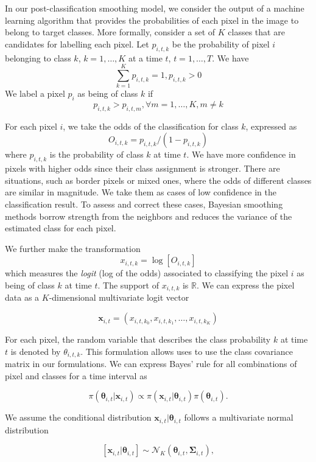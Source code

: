 \documentclass[
  11pt,
]{report}
\begin{document}
In our post-classification smoothing model, we consider the output of a
machine learning algorithm that provides the probabilities of each pixel
in the image to belong to target classes. More formally, consider a set
of \(K\) classes that are candidates for labelling each pixel. Let
\(p_{i,t,k}\) be the probability of pixel \(i\) belonging to class
\(k\), \(k = 1, \dots, K\) at a time \(t\), \(t=1,\dots{},T\). We have
\[
\sum_{k=1}^K p_{i,t,k} = 1, p_{i,t,k} > 0
\] We label a pixel \(p_i\) as being of class \(k\) if \[
    p_{i,t,k} > p_{i,t,m}, \forall m = 1, \dots, K, m \neq k
\]

For each pixel \(i\), we take the odds of the classification for class
\(k\), expressed as \[
    O_{i,t,k} = p_{i,t,k} / (1-p_{i,t,k})
\] where \(p_{i,t,k}\) is the probability of class \(k\) at time \(t\).
We have more confidence in pixels with higher odds since their class
assignment is stronger. There are situations, such as border pixels or
mixed ones, where the odds of different classes are similar in
magnitude. We take them as cases of low confidence in the classification
result. To assess and correct these cases, Bayesian smoothing methods
borrow strength from the neighbors and reduces the variance of the
estimated class for each pixel.

We further make the transformation \[
    x_{i,t,k} = \log [O_{i,t,k}]
\] which measures the \emph{logit} (log of the odds) associated to
classifying the pixel \(i\) as being of class \(k\) at time \(t\). The
support of \(x_{i,t,k}\) is \(\mathbb{R}\). We can express the pixel
data as a \(K\)-dimensional multivariate logit vector

\[
\mathbf{x}_{i,t}=(x_{i,t,k_{0}},x_{i,t,k_{1}},\dots{},x_{i,t,k_{K}})
\]

For each pixel, the random variable that describes the class probability
\(k\) at time \(t\) is denoted by \(\theta_{i,t,k}\). This formulation
allows uses to use the class covariance matrix in our formulations. We
can express Bayes' rule for all combinations of pixel and classes for a
time interval as

\[
\pi(\boldsymbol\theta_{i,t}|\mathbf{x}_{i,t}) \propto \pi(\mathbf{x}_{i,t}|\boldsymbol\theta_{i,t})\pi(\boldsymbol\theta_{i,t}).    
\]

We assume the conditional distribution
\(\mathbf{x}_{i,t}|\boldsymbol\theta_{i,t}\) follows a multivariate
normal distribution

\[
    [\mathbf{x}_{i,t}|\boldsymbol\theta_{i,t}]\sim\mathcal{N}_{K}(\boldsymbol\theta_{i,t},\boldsymbol\Sigma_{i,t}),
\]
\end{document}
